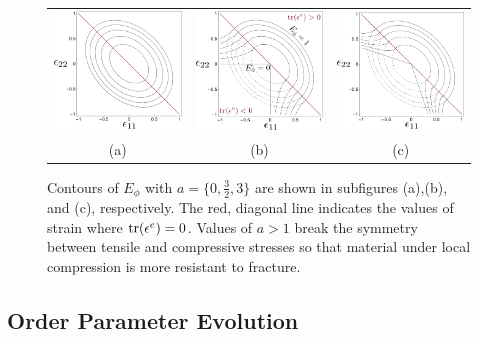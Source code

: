 \begin{figure}[h!]
	\begin{center}
	\begin{tabular}{ccc}
		\includegraphics[width=0.3\columnwidth]{ch-fracture/asymmetric_energy/plot_0} &
		\includegraphics[width=0.3\columnwidth]{ch-fracture/asymmetric_energy/plot_15} &
		\includegraphics[width=0.3\columnwidth]{ch-fracture/asymmetric_energy/plot_3}  \\
		(a) & (b) & (c)
	\end{tabular}
	\caption{Contours of $E_{\phi}$ with $a=\{0,\tfrac{3}{2},3\}$ are shown in subfigures (a),(b), and (c), respectively. The red, diagonal line indicates the values of strain where $\text{tr}(\epsilon^e)=0$. Values of $a>1$ break the symmetry between tensile and compressive stresses so that material under local compression is more resistant to fracture.}
	\label{fig:elastic_asymmetry}
	\end{center}
\end{figure}


\subsection{Order Parameter Evolution}

